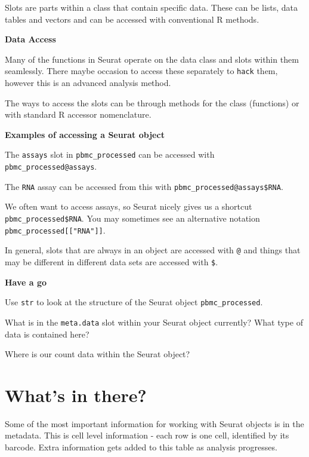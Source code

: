 \documentclass[
]{book}
\begin{document}
Slots are parts within a class that contain specific data. These can be lists, data tables and vectors and can be accessed with conventional R methods.

\textbf{Data Access}

Many of the functions in Seurat operate on the data class and slots within them seamlessly. There maybe occasion to access these separately to \texttt{hack} them, however this is an advanced analysis method.

The ways to access the slots can be through methods for the class (functions) or with standard R accessor nomenclature.

\textbf{Examples of accessing a Seurat object}

The \texttt{assays} slot in \texttt{pbmc\_processed} can be accessed with \texttt{pbmc\_processed@assays}.

The \texttt{RNA} assay can be accessed from this with \texttt{pbmc\_processed@assays\$RNA}.

We often want to access assays, so Seurat nicely gives us a shortcut \texttt{pbmc\_processed\$RNA}. You may sometimes see an alternative notation \texttt{pbmc\_processed{[}{[}"RNA"{]}{]}}.

In general, slots that are always in an object are accessed with \texttt{@} and things that may be different in different data sets are accessed with \texttt{\$}.

\textbf{Have a go}

Use \texttt{str} to look at the structure of the Seurat object \texttt{pbmc\_processed}.

What is in the \texttt{meta.data} slot within your Seurat object currently? What type of data is contained here?

Where is our count data within the Seurat object?

\section{What's in there?}\label{whats-in-there}

Some of the most important information for working with Seurat objects is in the metadata.
This is cell level information - each row is one cell, identified by its barcode.
Extra information gets added to this table as analysis progresses.
\end{document}
